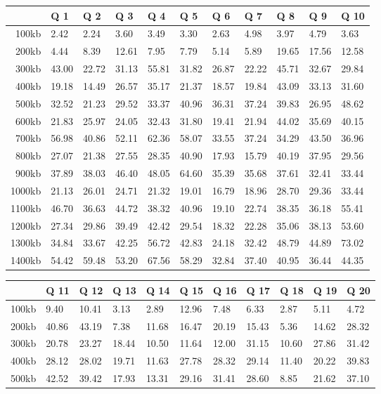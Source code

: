 
\begin {table}[htpb]
\centering
\begin{tabular}{r|l|l|l|l|l|l|l|l|l|l}
&Q 1&Q 2&Q 3&Q 4&Q 5&Q 6&Q 7&Q 8&Q 9&Q 10\\
\hline
100kb&2.42&2.24&3.60&3.49&3.30&2.63&4.98&3.97&4.79&3.63\\
200kb&4.44&8.39&12.61&7.95&7.79&5.14&5.89&19.65&17.56&12.58\\
300kb&43.00&22.72&31.13&55.81&31.82&26.87&22.22&45.71&32.67&29.84\\
400kb&19.18&14.49&26.57&35.17&21.37&18.57&19.84&43.09&33.13&31.60\\
500kb&32.52&21.23&29.52&33.37&40.96&36.31&37.24&39.83&26.95&48.62\\
600kb&21.83&25.97&24.05&32.43&31.80&19.41&21.94&44.02&35.69&40.15\\
700kb&56.98&40.86&52.11&62.36&58.07&33.55&37.24&34.29&43.50&36.96\\
800kb&27.07&21.38&27.55&28.35&40.90&17.93&15.79&40.19&37.95&29.56\\
900kb&37.89&38.03&46.40&48.05&64.60&35.39&35.68&37.61&32.41&33.44\\
1000kb&21.13&26.01&24.71&21.32&19.01&16.79&18.96&28.70&29.36&33.44\\
1100kb&46.70&36.63&44.72&38.32&40.96&19.10&22.74&38.35&36.18&55.41\\
1200kb&27.34&29.86&39.49&42.42&29.54&18.32&22.28&35.06&38.13&53.60\\
1300kb&34.84&33.67&42.25&56.72&42.83&24.18&32.42&48.79&44.89&73.02\\
1400kb&54.42&59.48&53.20&67.56&58.29&32.84&37.40&40.95&36.44&44.35\\
\end{tabular}
\newline
\vspace*{0.5 cm}
\newline
\begin{tabular}{r|l|l|l|l|l|l|l|l|l|l}
&Q 11&Q 12&Q 13&Q 14&Q 15&Q 16&Q 17&Q 18&Q 19&Q 20\\
\hline
100kb&9.40&10.41&3.13&2.89&12.96&7.48&6.33&2.87&5.11&4.72\\
200kb&40.86&43.19&7.38&11.68&16.47&20.19&15.43&5.36&14.62&28.32\\
300kb&20.78&23.27&18.44&10.50&11.64&12.00&31.15&10.60&27.86&31.42\\
400kb&28.12&28.02&19.71&11.63&27.78&28.32&29.14&11.40&20.22&39.83\\
500kb&42.52&39.42&17.93&13.31&29.16&31.41&28.60&8.85&21.62&37.10\\

\end{tabular}
\end{table}
